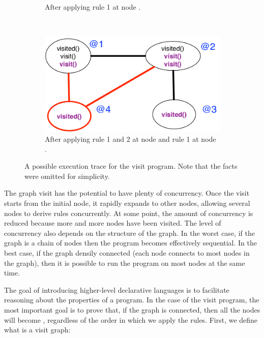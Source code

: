 \begin{figure}[h]
\begin{subfigure}[b]{0.45\textwidth}
                \caption{After applying rule 1 at node .}
                \label{fig:exec_trace3}
        \end{subfigure}%
        ~ %
        \begin{subfigure}[b]{0.45\textwidth}
                  \includegraphics[width=\textwidth]{figures/visit/trace4}

                  \caption{After applying rule 1 and 2 at node  and
                  rule 1 at node .}

                  \label{fig:exec_trace4}
          \end{subfigure}
        \caption{A possible execution trace for the visit
           program. Note that the  facts were omitted for simplicity.}
        \label{fig:exec_trace}
\end{figure}

The graph visit has the potential to have plenty of concurrency. Once the visit
starts from the initial node, it rapidly expands to other nodes, allowing
several nodes to derive rules concurrently. At some point, the amount of
concurrency is reduced because more and more nodes have been visited. The level
of concurrency also depends on the structure of the graph. In the worst case, if
the graph is a chain of nodes then the program becomes effectively sequential.
In the best case, if the graph densily connected (each node connects to most
nodes in the graph), then it is possible to run the program on most nodes at the
same time.

The goal of introducing higher-level declarative languages is to facilitate
reasoning about the properties of a program. In the case of the visit program,
the most important goal is to prove that, if the graph is connected, then all
the nodes will become , regardless of the order in which we apply
the rules. First, we define what is a visit graph:

